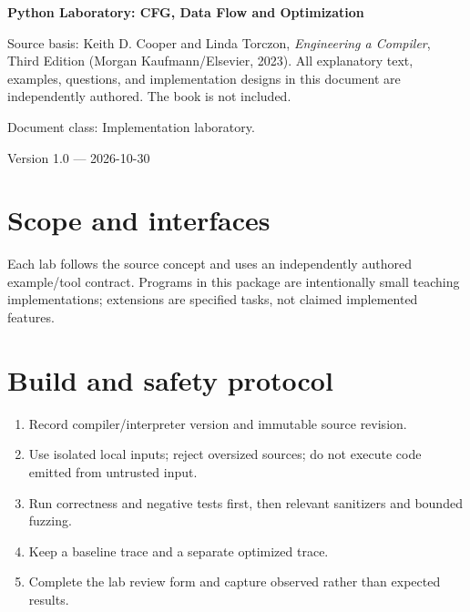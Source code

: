 \documentclass[10pt,letterpaper]{article}
\begin{document}
\begin{titlepage}
\centering\vspace*{1.0in}
{\Huge\bfseries\textcolor{CompilerBlue}{Python Laboratory: CFG, Data Flow and Optimization}\par}
\vspace{.22in}{\Large Executable reference kernels plus guided extensions\par}
\vspace{.4in}{\large Compiler Engineering Documentation Suite\par}
\vfill
\begin{minipage}{.86\linewidth}\small
Source basis: Keith D. Cooper and Linda Torczon, \emph{Engineering a Compiler}, Third Edition (Morgan Kaufmann/Elsevier, 2023). All explanatory text, examples, questions, and implementation designs in this document are independently authored. The book is not included.\par\medskip
Document class: Implementation laboratory.
\end{minipage}
\vfill\textcolor{CompilerGray}{Version 1.0 --- 2026-10-30}\par
\end{titlepage}
\tableofcontents\clearpage
\section{Scope and interfaces}
Each lab follows the source concept and uses an independently authored example/tool contract. Programs in this package are intentionally small teaching implementations; extensions are specified tasks, not claimed implemented features.

\section{Build and safety protocol}
\begin{enumerate}
\item Record compiler/interpreter version and immutable source revision.
\item Use isolated local inputs; reject oversized sources; do not execute code emitted from untrusted input.
\item Run correctness and negative tests first, then relevant sanitizers and bounded fuzzing.
\item Keep a baseline trace and a separate optimized trace.
\item Complete the lab review form and capture observed rather than expected results.
\end{enumerate}
\end{document}
